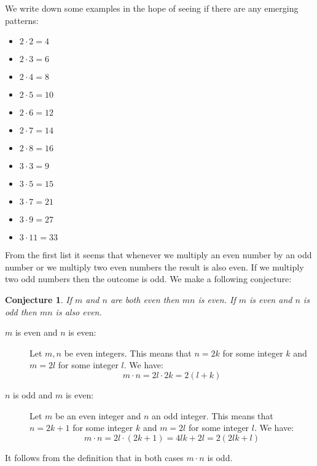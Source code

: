\documentclass{article}
\newtheorem*{conjecture}{Conjecture}
\begin{document}
We write down some examples in the hope of seeing if there are any emerging
patterns:

\begin{itemize}
	\item $2 \cdot 2 = 4$
	\item $2 \cdot 3 = 6$
	\item $2 \cdot 4 = 8$
	\item $2 \cdot 5 = 10$
	\item $2 \cdot 6 = 12$
	\item $2 \cdot 7 = 14$
	\item $2 \cdot 8 = 16$
\end{itemize}


\begin{itemize}
	\item $3 \cdot 3 = 9$
	\item $3 \cdot 5 = 15$
	\item $3 \cdot 7 = 21$
	\item $3 \cdot 9 = 27$
	\item $3 \cdot 11 = 33$
\end{itemize}


From the first list it seems that whenever we multiply an even number by an odd
number or we multiply two even numbers the result is also even. If we multiply
two odd numbers then the outcome is odd. We make a following conjecture:

\begin{conjecture}
	If $m$ and $n$ are both even then $mn$ is even. If $m$ is even and $n$
	is odd then $mn$ is also even.
\end{conjecture}


\begin{description}
    \item[$m$ is even and $n$ is even:]
	    Let $m, n$ be even integers. This means that $n = 2k$ for some
	    integer $k$ and $m = 2l$ for some integer $l$. We have:
	    \begin{equation*}
		m \cdot n = 2l \cdot 2k = 2(l+k)
	\end{equation*}
    \item[$n$ is odd and $m$ is even:]
	    Let $m$ be an even integer and $n$ an odd integer. This means that
	    $n = 2k + 1$ for some
	    integer $k$ and $m = 2l$ for some integer $l$. We have:
	    \begin{equation*}
		    m \cdot n = 2l \cdot (2k + 1) = 4lk +2l = 2(2lk + l)
	    \end{equation*}
    \end{description}
\noindent
It follows from the definition that in both cases $m \cdot n$ is odd.
\end{document}
